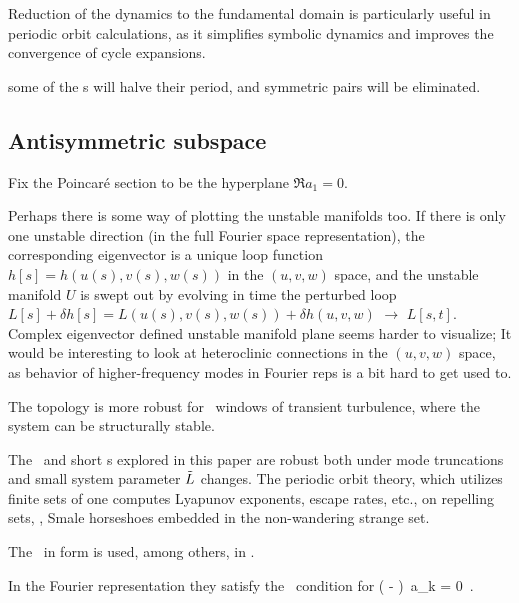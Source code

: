\bigskip

Reduction of the dynamics to the fundamental domain is particularly
useful in periodic orbit calculations, as it simplifies symbolic dynamics
and improves the convergence of cycle expansions.

some of the \po s will
halve their period, and symmetric pairs will be eliminated.

\subsection{Antisymmetric subspace}

Fix the  Poincar\'e section to be the hyperplane $\Re a_1=0$.

\bigskip

Perhaps there is some way of plotting the unstable manifolds too. If
there is only one unstable direction (in the full Fourier space
representation), the corresponding eigenvector is a unique loop function
$h[s] =  h(u(s),v(s),w(s))$ in the $(u,v,w)$ space, and the unstable manifold
$U$ is swept out by evolving in time the perturbed loop
$L[s] + \delta h[s] =  L(u(s),v(s),w(s)) + \delta h(u,v,w)$
$\to$ $L[s,t]$.
Complex eigenvector defined unstable manifold plane seems
harder to visualize;  It would be interesting
to look at heteroclinic connections in the $(u,v,w)$ space, as
behavior of higher-frequency modes in Fourier reps is a bit
hard to get used to.

\bigskip

The topology is more robust for \tildeL\ windows
of transient turbulence, where the system can be
structurally stable.

The \eqva\ and short \po s explored in this paper
are robust both under mode truncations and small
system parameter $\tilde{L}$ changes.
The periodic orbit theory, which utilizes finite sets
of
one computes Lyapunov exponents, escape rates, etc.,
on {repelling sets}, \ie, Smale horseshoes embedded in the
non-wandering strange set.

\bigskip

The \KSe\ in  form  is used, among others, in
.

\bigskip

In the Fourier representation they satisfy
the \eqv\ condition for 
\beq
\left(  -   \right)\, a_k
  = 0
\,.
\label{eq:stfks}
\eeq

